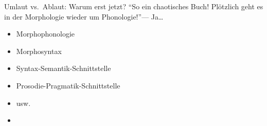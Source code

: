 \begin{frame}
  {Umlaut vs.\ Ablaut: Warum erst jetzt?}
  \pause
  \alert{"`So ein chaotisches Buch! Plötzlich geht es\\
  in der Morphologie wieder um Phonologie!"'}\pause --- Ja\dots
  \pause
  \Zeile
  \begin{itemize}[<+->]
    \item Morphophonologie
    \item Morphosyntax
    \item Syntax-Semantik-Schnittstelle
    \item Prosodie-Pragmatik-Schnittstelle
    \item usw.
      \Zeile
    \item {}
  \end{itemize}
\end{frame}

